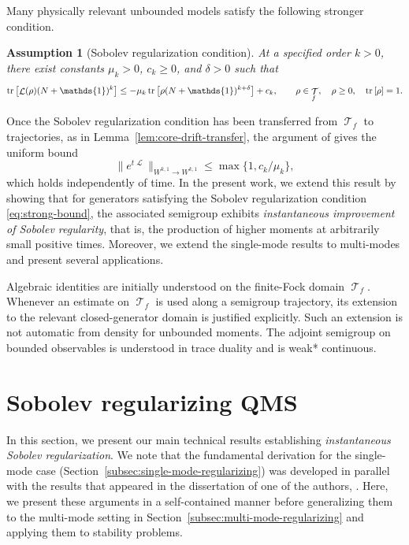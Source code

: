 \documentclass[11pt]{article}
\theoremstyle{myplain}
\newtheorem{regularizationassum}{Assumption}
\theoremstyle{mydefinition}
\theoremstyle{remark}
\DeclareMathOperator{\cL}{\mathcal{L}}
\DeclareMathOperator{\cT}{\mathcal{T}}
\DeclareMathOperator{\1}{\mathds{1}}
\newcommand{\tr}[1][]{\operatorname{tr}%
  \ifx#1\empty \else \left[ #1 \right] \fi}
\begin{document}
    Many physically relevant unbounded models satisfy the following stronger condition.
    
    \begin{regularizationassum}[Sobolev regularization condition]\label{assum:single-mode-regularization}
        At a specified order $k > 0$, there exist constants $\mu_k > 0$,
        $c_k \geq 0$, and $\delta > 0$ such that
        \begin{equation}\label{eq:strong-bound}
            \tr[\cL(\rho)(N + \1)^k] \leq -\mu_k \tr[\rho (N + \1)^{k + \delta}] + c_k,
            \qquad \rho \in \cT_f,\quad \rho \geq 0,\quad \tr[\rho] = 1.
        \end{equation}
    \end{regularizationassum}
    
    
    Once the Sobolev regularization condition has been transferred from $\cT_f$ to trajectories, as in Lemma~\ref{lem:core-drift-transfer}, the argument of \cite[Prop.~4.1]{Gondolf.2024} gives the uniform bound
    \begin{equation}\label{eq:uniform-bound}
        \|e^{t\cL}\|_{W^{k,1} \to W^{k,1}} \le \max\{1, c_k / \mu_k\},
    \end{equation}
    which holds independently of time. In the present work, we extend this result by showing that for generators satisfying the Sobolev regularization condition \eqref{eq:strong-bound}, the associated semigroup exhibits \emph{instantaneous improvement of Sobolev regularity}, that is, the production of higher moments at arbitrarily small positive times. Moreover, we extend the single-mode results to multi-modes and present several applications.

    Algebraic identities are initially understood on the finite-Fock domain $\cT_f$. Whenever an estimate on $\cT_f$ is used along a semigroup trajectory, its extension to the relevant closed-generator domain is justified explicitly. Such an extension is not automatic from density for unbounded moments. The adjoint semigroup on bounded observables is understood in trace duality and is weak* continuous.


\section{Sobolev regularizing QMS}\label{sec:sobo-regularizing-qms}
    In this section, we present our main technical results establishing \emph{instantaneous Sobolev regularization}. We note that the fundamental derivation for the single-mode case (Section~\ref{subsec:single-mode-regularizing}) was developed in parallel with the results that appeared in the dissertation of one of the authors, \cite[Thm.~3.4.8]{Gondolf.2025thesis}. Here, we present these arguments in a self-contained manner before generalizing them to the multi-mode setting in Section~\ref{subsec:multi-mode-regularizing} and applying them to stability problems.
\end{document}
